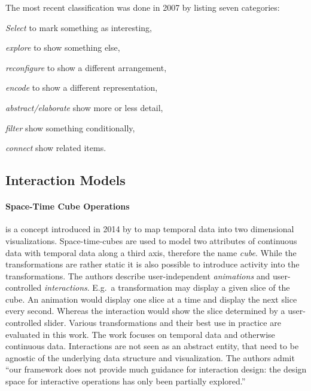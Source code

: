 \documentclass{article}
\begin{document}
The most recent classification was done in 2007 by \textcite{Yi2007} listing seven categories:
\begin{enumerate*}[label=(\arabic*)]
  \item
    \emph{Select} to mark something as interesting,
  \item
    \emph{explore} to show something else,
  \item
    \emph{reconfigure} to show a different arrangement,
  \item
    \emph{encode} to show a different representation,
  \item
    \emph{abstract/elaborate} show more or less detail,
  \item
    \emph{filter} show something conditionally,
  \item
    \emph{connect} show related items.
\end{enumerate*}


\subsection{Interaction Models}

\paragraph{Space-Time Cube Operations}
is a concept introduced in 2014 by \textcite{Bach2014} to map temporal data into two dimensional visualizations.
Space-time-cubes are used to model two attributes of continuous data with temporal data along a third axis, therefore the name \emph{cube}.
While the transformations are rather static it is also possible to introduce activity into the transformations.
The authors describe user-independent \emph{animations} and user-controlled \emph{interactions}.
E.g.\ a transformation may display a given slice of the cube.
An animation would display one slice at a time and display the next slice every second.
Whereas the interaction would show the slice determined by a user-controlled slider.
Various transformations and their best use in practice are evaluated in this work.
The work focuses on temporal data and otherwise continuous data.
Interactions are not seen as an abstract entity, that need to be agnostic of the underlying data structure and visualization.
The authors admit ``our framework does not provide much guidance for interaction design: the design space for interactive operations has only been partially explored.''\cite[Other limitations, p.~15]{Bach2014}
\end{document}
